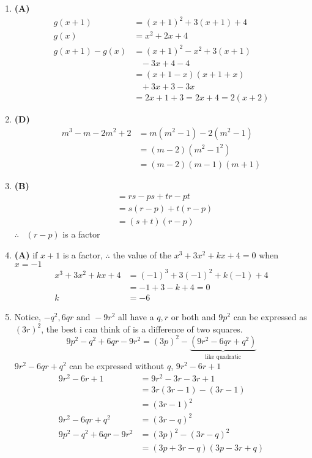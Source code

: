 \begin{multicols}{2}
\begin{enumerate}[label={\textbf{\arabic*.}}]
    \item \textbf{(A)} \begin{align*}
        g(x + 1) &= (x + 1) ^2 + 3(x + 1) + 4  \\
        g(x) & = x^2 + 2x + 4 \\
        g(x + 1) - g(x) & = (x+ 1)^2 - x^2 + 3(x+1)  \\
        & \hspace{10pt} - 3x + 4 - 4 \\
        & = (x + 1 - x)(x + 1 + x) \\
        &\hspace{10pt} + 3x + 3 - 3x \\
        & = 2x + 1 + 3 = 2x + 4 = 2(x + 2)
    \end{align*}
    \item \textbf{(D)} \begin{align*} 
        m^3 - m -2m^2 + 2 &= m(m^2 -1) -2 (m^2 -1) \\
        & = (m - 2)(m^2 - 1^2) \\
        & = (m-2)(m-1)(m+1)
    \end{align*}
    \item \textbf{(B)} \begin{align*} 
        & = rs -ps + tr - pt \\
        & = s(r-p) + t(r-p) \\
        & = (s + t)(r-p)
    \end{align*}
    $\therefore \hspace{10pt} (r-p) $ is a factor
    \item \textbf{(A)} if $x + 1$ is a factor, $\therefore$ the value of the $x^3 + 3x^2 + kx + 4 = 0$ when $x = -1$ \\
    \begin{align*}
        x^3 + 3x^2 + kx + 4 &= (-1)^3 + 3(-1)^2 +k(-1) + 4 \\
        & = -1 + 3 -k + 4 = 0 \\
        k & = -6 
    \end{align*}

    \item Notice, $-q^2, 6qr \text{ and } -9r^2 $ all have a $q, r$ or both and $9p^2$ can be expressed as $(3r)^2$, the best i can think of is a difference of two squares. \\
    $$9p^2 - q^2 + 6qr - 9r^2 = (3p)^2 - \underbrace{(9r^2 - 6qr + q^2)}_{\text{like quadratic} }$$ 
    $9r^2 - 6qr + q^2$ can be expressed without $q$,  $9r^2 - 6r + 1$ 
    \begin{align*}
    9r^2 - 6r + 1 &= 9r^2 - 3r - 3r + 1 \\
    &= 3r(3r -1) -(3r -1) \\ &= (3r -1)^2 \\
    9r^2 - 6qr + q^2  &= (3r -q)^2 \\
    9p^2 - q^2 + 6qr - 9r^2 &= (3p)^2 - (3r -q)^2 \\
    &= (3p + 3r - q)(3p - 3r + q) 
    \end{align*}


\end{enumerate}
\end{multicols}
